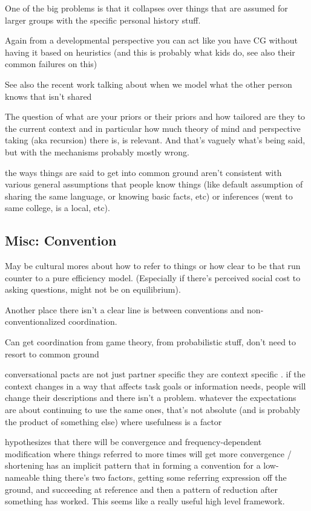 \documentclass[]{article}
\begin{document}
One of the big problems is that it collapses over things that are assumed for larger groups with the specific personal history stuff. 



Again from a developmental perspective you can act like you have CG without having it based on heuristics (and this is probably what kids do, see also their common failures on this) 

See also the recent work talking about when we model what the other person knows that isn't shared 

The question of what are your priors or their priors and how tailored are they to the current context and in particular how much theory of mind and perspective taking (aka recursion) there is, is relevant. And that's vaguely what's being said, but with the mechanisms probably mostly wrong. 

the ways things are said to get into common ground aren't consistent with various general assumptions that people know things (like default assumption of sharing the same language, or knowing basic facts, etc) or inferences (went to same college, is a local, etc). 



\subsection{Misc: Convention}

May be cultural mores about how to refer to things or how clear to be that run counter to a pure efficiency model. (Especially if there's perceived social cost to asking questions, might not be on equilibrium). 


Another place there isn't a clear line is between conventions and non-conventionalized coordination. 

Can get coordination from game theory, from probabilistic stuff, don't need to resort to common ground

conversational pacts are not just partner specific they are context specific \cite{ibarra2016}. if the context changes in a way that affects task goals or information needs, people will change their descriptions and there isn't a problem. whatever the expectations are about continuing to use the same ones, that's not absolute (and is probably the product of something else) where usefulness is a factor 

\cite{krauss1964} hypothesizes that there will be convergence and frequency-dependent modification where things referred to more times will get more convergence / shortening
 \cite{leung2023} has an implicit pattern that in forming a convention for a low-nameable thing there's two factors, getting some referring expression off the ground, and succeeding at reference and then a pattern of reduction after something has worked. This seems like a really useful high level framework. 
 
\end{document}
